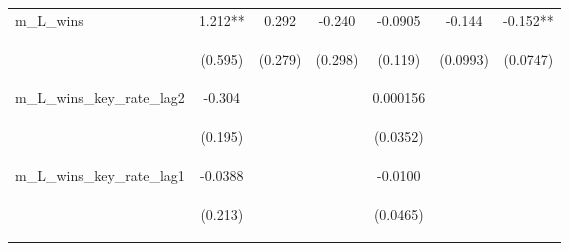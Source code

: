 \documentclass[]{article}
\begin{document}
\begin{center}
\begin{tabular}{lcccccc}
m\_L\_wins & 1.212** & 0.292 & -0.240 & -0.0905 & -0.144 & -0.152** \\
\vspace{4pt} & \begin{footnotesize}(0.595)\end{footnotesize} & \begin{footnotesize}(0.279)\end{footnotesize} & \begin{footnotesize}(0.298)\end{footnotesize} & \begin{footnotesize}(0.119)\end{footnotesize} & \begin{footnotesize}(0.0993)\end{footnotesize} & \begin{footnotesize}(0.0747)\end{footnotesize} \\
m\_L\_wins\_key\_rate\_lag2 & -0.304 &  &  & 0.000156 &  &  \\
\vspace{4pt} & \begin{footnotesize}(0.195)\end{footnotesize} & \begin{footnotesize}\end{footnotesize} & \begin{footnotesize}\end{footnotesize} & \begin{footnotesize}(0.0352)\end{footnotesize} & \begin{footnotesize}\end{footnotesize} & \begin{footnotesize}\end{footnotesize} \\
m\_L\_wins\_key\_rate\_lag1 & -0.0388 &  &  & -0.0100 &  &  \\
\vspace{4pt} & \begin{footnotesize}(0.213)\end{footnotesize} & \begin{footnotesize}\end{footnotesize} & \begin{footnotesize}\end{footnotesize} & \begin{footnotesize}(0.0465)\end{footnotesize} & \begin{footnotesize}\end{footnotesize} & \begin{footnotesize}\end{footnotesize} \\

\end{tabular}
\end{center}
\end{document}
